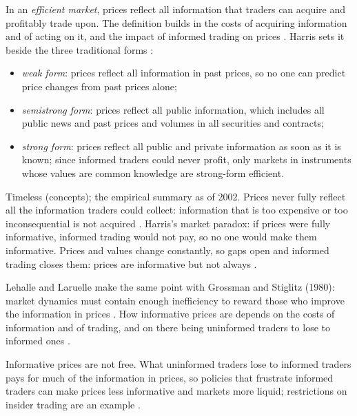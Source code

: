 \begin{qfdefinition}\label{def:market-efficiency}
 In an \emph{efficient market}, prices reflect all information that traders can acquire and profitably trade upon. The definition builds in the costs of acquiring information and of acting on it, and the impact of informed trading on prices \citep[chap.~``Informed Traders and Market Efficiency'', sec.~10.6.6, p.~240]{alpha-harris}. Harris sets it beside the three traditional forms \citep[same sec., p.~240]{alpha-harris}:
\begin{itemize}
\item \emph{weak form}: prices reflect all information in past prices, so no one can predict price changes from past prices alone;
\item \emph{semistrong form}: prices reflect all public information, which includes all public news and past prices and volumes in all securities and contracts;
\item \emph{strong form}: prices reflect all public and private information as soon as it is known; since informed traders could never profit, only markets in instruments whose values are common knowledge are strong-form efficient.
\end{itemize}

 Timeless (concepts); the empirical summary as of 2002. Prices never fully reflect all the information traders could collect: information that is too expensive or too inconsequential is not acquired \citep[same sec., p.~240]{alpha-harris}. Harris's market paradox: if prices were fully informative, informed trading would not pay, so no one would make them informative. Prices and values change constantly, so gaps open and informed trading closes them: prices are informative but not always \citep[same chap., sec.~10.6.4, pp.~238--239]{alpha-harris}.

Lehalle and Laruelle make the same point with Grossman and Stiglitz (1980): market dynamics must contain enough inefficiency to reward those who improve the information in prices \citep[Introduction, p.~4]{alpha-laruelle}. How informative prices are depends on the costs of information and of trading, and on there being uninformed traders to lose to informed ones \citep[same chap., secs.~10.6.3 and~10.7, pp.~238 and~243--244]{alpha-harris}.

 Informative prices are not free. What uninformed traders lose to informed traders pays for much of the information in prices, so policies that frustrate informed traders can make prices less informative and markets more liquid; restrictions on insider trading are an example \citep[same chap., sec.~10.6.7, p.~241]{alpha-harris}.


\end{qfdefinition}
